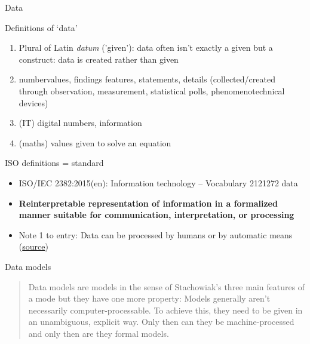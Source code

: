 \begin{frame}[allowframebreaks]{Data}
\begin{block}{Definitions of `data'}
    \begin{enumerate}\footnotesize
        \item Plural of Latin \emph{datum} ('given'): data often isn't exactly a given but a construct: data is created rather than given
        \item  \lbrack{}number\rbrack{}values, findings features, statements, details (collected/created through observation, measurement, statistical polls, phenomenotechnical devices)
        \item (IT) digital numbers, information 
        \item (maths) values given to solve an equation 
    \end{enumerate}
\end{block}

\begin{block}{ISO definitions = standard}\scriptsize
\begin{itemize}
    \item ISO/IEC 2382:2015(en): Information technology -- Vocabulary 2121272 data
    \item \textbf{Reinterpretable representation of information in a formalized manner suitable for communication, interpretation, or processing}
    \item Note 1 to entry: Data can be processed by humans or by automatic means (\href{https://www.iso.org/obp/ui/\#iso:std:iso-iec:2382:ed-1:v1:en}{source})
\end{itemize}
\end{block}

\framebreak
    \begin{block}{Data models}
    \begin{quote}
        Data models are models in the sense of Stachowiak's three main features of a mode but they have one more property: Models generally aren't necessarily computer-processable. To achieve this, they need to be given in an unambiguous, explicit way. Only then can they be machine-processed and only then are they formal models. 
        ~\parencite[100][translated from German]{JannidisIntroDatamod}
    \end{quote}
    \end{block}
\end{frame}


